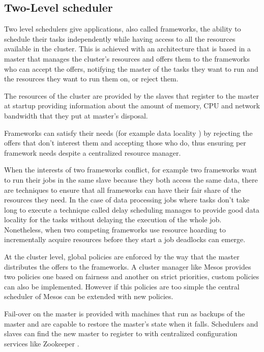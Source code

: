 \documentclass{svjour3}                     %
\begin{document}
\subsection{Two-Level scheduler}

Two level schedulers give applications, also called
frameworks, the ability to schedule their tasks independently while
having access to all the resources available in the cluster. This
is achieved with an architecture that is based in a master that manages
the cluster's resources and offers them to the frameworks who can accept 
the offers, notifying the master of the tasks they want to run and the
resources they want to run them on, or reject them.

The resources of the cluster are provided by the slaves that register to 
the master at startup providing information about the amount of memory, CPU
and network bandwidth  that they put at master's disposal.  

Frameworks can satisfy their needs (for example data locality \cite{chung_maximizing_2006} ) by 
rejecting the offers that don't interest them and accepting those who do, thus
ensuring per framework needs despite a centralized resource manager. 

When the interests of two frameworks conflict, for example two
frameworks want to run their jobs in the same slave because they both
access the same data, there are techniques to ensure that all
frameworks can have their fair share of the resources they need. In
the case of data processing jobs where tasks don't take long to
execute a technique called delay scheduling \cite{zaharia_delay_2010}
manages to provide good data locality for the tasks without delaying
the execution of the whole job. Nonetheless, when two competing
frameworks use resource hoarding to incrementally acquire resources
before they start a job deadlocks can emerge.

At the cluster level, global policies are enforced by the way that the
master distributes the offers to the frameworks. A cluster manager
like Mesos \cite{Hindman10mesos:a} provides two policies one based on
fairness \cite{AjtaiANRSW1998} and another on strict priorities,
custom policies can also be implemented. However if this policies are
too simple the central scheduler of Mesos can be extended with new
policies.

Fail-over on the master is provided with machines that run as backups of the master and
are capable to restore the master's state when it falls. Schedulers and slaves can find
the new master to register to with centralized configuration services like Zookeeper \cite{_apache_????}.
\end{document}
